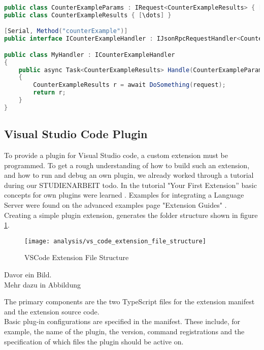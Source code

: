 \begin{lstlisting}[language=csharp, caption={LSP Handler Implementation}, captionpos=b, label={lst:lspcustomhandler}]
public class CounterExampleParams : IRequest<CounterExampleResults> { [\dots] }
public class CounterExampleResults { [\dots] }

[Serial, Method("counterExample")]
public interface ICounterExampleHandler : IJsonRpcRequestHandler<CounterExampleParams, CounterExampleResults> { }

public class MyHandler : ICounterExampleHandler
{
    public async Task<CounterExampleResults> Handle(CounterExampleParams request, CancellationToken c)
    {
        CounterExampleResults r = await DoSomething(request);
        return r;
    }
}
\end{lstlisting}


\subsection{Visual Studio Code Plugin}
To provide a plugin for Visual Studio code, a custom extension must be programmed.
To get a rough understanding of how to build such an extension, and how to run and debug an own plugin, we already worked through a tutorial during our STUDIENARBEIT todo.
In the tutorial "Your First Extension” basic concepts for own plugins were learned \cite{vscode-first-extension}.
Examples for integrating a Language Server were found on the advanced examples page "Extension Guides" \cite{vscode-extensions}. \\

Creating a simple plugin extension, generates the folder structure shown in figure \ref{fig:vs_code_extension_file_structure}.

\begin{figure}[H]
    \centering
    \texttt{[image: analysis/vs\_code\_extension\_file\_structure]}
    \caption{VSCode Extension File Structure}
    \label{fig:vs_code_extension_file_structure}
\end{figure}
Davor ein Bild. \\
Mehr dazu in Abbildung

The primary components are the two TypeScript files for the extension manifest and the extension source code. \\

Basic plug-in configurations are specified in the manifest.
These include, for example, the name of the plugin, the version,
command registrations and the specification of which files the plugin should be active on. \\

